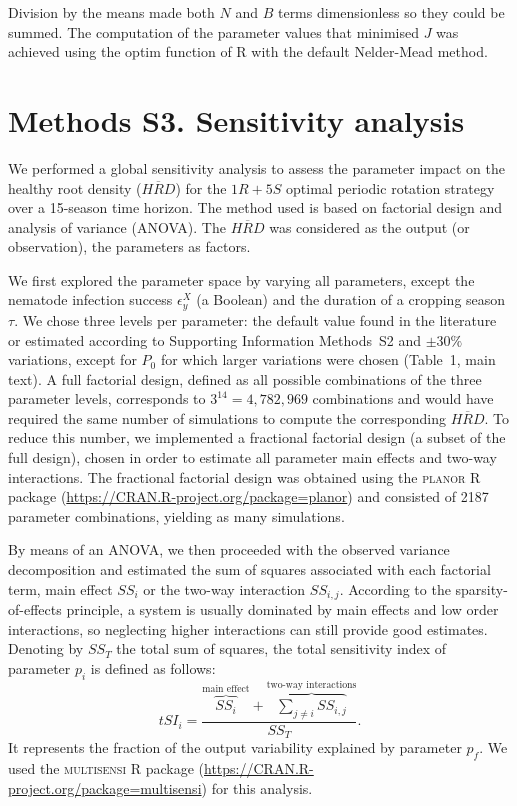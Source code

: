 Division by the means made both $N$ and $B$ terms dimensionless so they could be summed. The computation of the parameter values that minimised $J$ was achieved using the optim function of R with the default Nelder-Mead method.


\clearpage
\section{Methods S3. Sensitivity analysis} \label{ans}

We performed a global sensitivity analysis to assess the parameter impact on the healthy root density ($\overline{HRD}$) for the $1R+5S$ optimal periodic rotation strategy over a 15-season time horizon. The method used is based on factorial design and analysis of variance (ANOVA). The $\overline{HRD}$ was considered as the output (or observation), the parameters as factors.

We first explored the parameter space  by varying  all parameters, except the nematode infection success $\epsilon_y^X$ (a Boolean)  and the duration of a cropping season $\tau$. We chose three levels per parameter: the default value found in the literature or estimated according to Supporting Information Methods~S2 and $\pm 30\%$ variations, except for $P_0$ for which larger variations were chosen (Table~1, main text). A full factorial design, defined as all possible combinations of the three parameter levels, corresponds to $3^{14}=4,782,969$ combinations and would have required the same number of simulations to compute the corresponding $\overline{HRD}$. To reduce this number, we implemented a fractional factorial design (a subset of the full design), chosen in order to estimate all parameter main effects  and two-way interactions. The fractional factorial design was obtained using the \textsc{planor} R package (\href{https://CRAN.R-project.org/package=planor}{https://CRAN.R-project.org/package=planor}) and consisted of 2187 parameter combinations, yielding as many simulations.

By means of an ANOVA, we then proceeded with the observed variance decomposition and estimated the sum of squares associated with each factorial term, main effect $SS_i$ or the two-way interaction $SS_{i,j}$. According to the sparsity-of-effects principle, a system is usually dominated by main effects and low order interactions, so neglecting  higher interactions can still provide good estimates. Denoting by  $SS_{T}$ the total sum of squares, the total sensitivity index of parameter $p_i$ is defined as follows:
\begin{equation}
\label{si}
tSI_i=\frac{\overbrace{SS_{i}}^{\text{main effect}}+\overbrace{ \sum_{j\neq i} SS_{i,j}}^{\text{two-way interactions}}}{SS_{T}}.
\end{equation}
It represents the fraction of the output variability explained by parameter $p_f$. 
We used the \textsc{multisensi} R package (\href{https://CRAN.R-project.org/package=multisensi}{https://CRAN.R-project.org/package=multisensi}) for this analysis.

